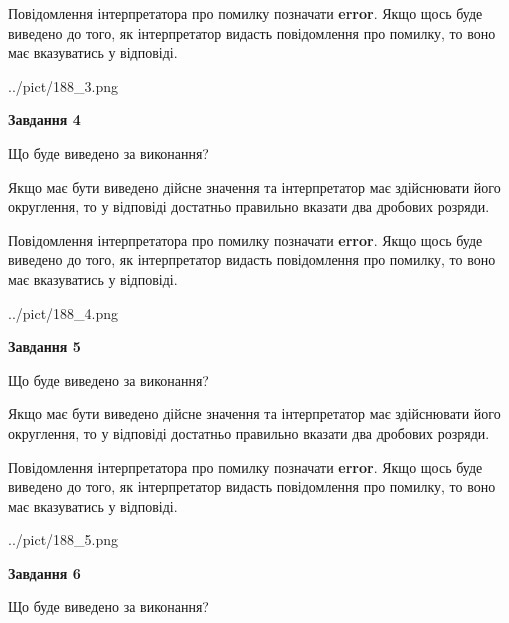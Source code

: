\documentclass[12pt, ukrainian]{article}
\begin{document}
{\begin {Large}
Повідомлення інтерпретатора про помилку позначати \textbf{error}.
Якщо щось буде виведено до того, як інтерпретатор видасть повідомлення про помилку, 
то воно має вказуватись у відповіді. \par

\begin{center}
	{../pict/188_3.png}
\end{center}
\newpage

{\begin {center}\textbf{Завдання 4}\end {center}}\par
Що буде виведено за виконання? \par

Якщо має бути виведено дійсне значення та інтерпретатор має здійснювати його округлення, 
то у відповіді достатньо правильно вказати два дробових розряди.

Повідомлення інтерпретатора про помилку позначати \textbf{error}.
Якщо щось буде виведено до того, як інтерпретатор видасть повідомлення про помилку, 
то воно має вказуватись у відповіді. \par

\begin{center}
	{../pict/188_4.png}
\end{center}
\newpage

{\begin {center}\textbf{Завдання 5}\end {center}}\par
Що буде виведено за виконання? \par

Якщо має бути виведено дійсне значення та інтерпретатор має здійснювати його округлення, 
то у відповіді достатньо правильно вказати два дробових розряди.

Повідомлення інтерпретатора про помилку позначати \textbf{error}.
Якщо щось буде виведено до того, як інтерпретатор видасть повідомлення про помилку, 
то воно має вказуватись у відповіді. \par

\begin{center}
	{../pict/188_5.png}
\end{center}
\newpage

{\begin {center}\textbf{Завдання 6}\end {center}}\par
Що буде виведено за виконання? \par


\end{Large}}
\end{document}
